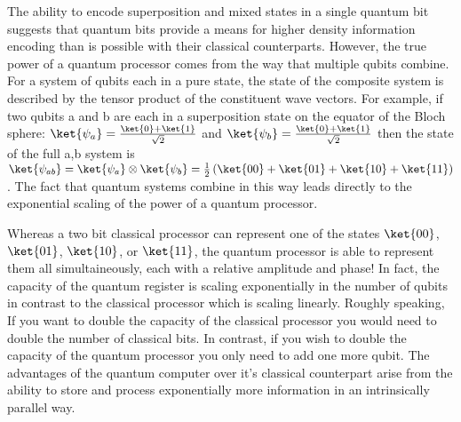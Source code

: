 The ability to encode superposition and mixed states in a single quantum bit suggests that quantum bits provide a means for higher density information encoding than is possible with their classical counterparts.
However, the true power of a quantum processor comes from the way that multiple qubits combine.
For a system of qubits each in a pure state, the state of the composite system is described by the tensor product of the constituent wave vectors.
For example, if two qubits a and b are each in a superposition state on the equator of the Bloch sphere:
$\ket{\psi_a} = \frac{\ket{0}+\ket{1}}{\sqrt{2}}$ and $\ket{\psi_b} = \frac{\ket{0}+\ket{1}}{\sqrt{2}}$
then the state of the full a,b system is
$\ket{\psi_{ab}} = \ket{\psi_a} \otimes \ket{\psi_b} = \frac{1}{2} \left( \ket{00} + \ket{01} + \ket{10} + \ket{11} \right)$.
The fact that quantum systems combine in this way leads directly to the exponential scaling of the power of a quantum processor.

Whereas a two bit classical processor can represent one of the states $\ket{00}$, $\ket{01}$, $\ket{10}$, or $\ket{11}$,
the quantum processor is able to represent them all simultaineously,
each with a relative amplitude and phase!
In fact, the capacity of the quantum register is scaling exponentially in the number of qubits in contrast to the classical processor which is scaling linearly.
Roughly speaking, If you want to double the capacity of the classical processor you would need to double the number of classical bits.
In contrast, if you wish to double the capacity of the quantum processor you only need to add one more qubit.
The advantages of the quantum computer over it's classical counterpart arise from the ability to store and process exponentially more information in an intrinsically parallel way.

